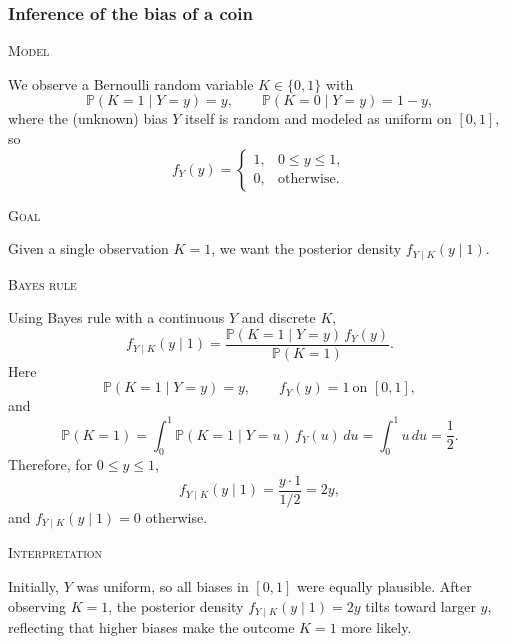 \subsubsection{Inference of the bias of a coin}

\textsc{Model}

We observe a Bernoulli random variable \(K\in\{0,1\}\) with
\[
\mathbb{P}(K=1\mid Y=y)=y,
\qquad
\mathbb{P}(K=0\mid Y=y)=1-y,
\]
where the (unknown) bias \(Y\) itself is random and modeled as uniform on \([0,1]\), so
\[
f_Y(y)
=
\begin{cases}
1, & 0 \le y \le 1,\\
0, & \text{otherwise}.
\end{cases}
\]

\textsc{Goal}

Given a single observation \(K=1\), we want the posterior density \(f_{Y\mid K}(y\mid 1)\).

\textsc{Bayes rule}

Using Bayes rule with a continuous \(Y\) and discrete \(K\),
\[
f_{Y\mid K}(y\mid 1)
=
\frac{\mathbb{P}(K=1\mid Y=y)\,f_Y(y)}
{\mathbb{P}(K=1)}.
\]
Here
\[
\mathbb{P}(K=1\mid Y=y)=y,
\qquad
f_Y(y)=1 \ \text{on }[0,1],
\]
and
\[
\mathbb{P}(K=1)
=
\int_{0}^{1} \mathbb{P}(K=1\mid Y=u)\,f_Y(u)\,du
=
\int_{0}^{1} u\,du
=
\frac{1}{2}.
\]
Therefore, for \(0\le y\le 1\),
\[
f_{Y\mid K}(y\mid 1)
=
\frac{y\cdot 1}{1/2}
=
2y,
\]
and \(f_{Y\mid K}(y\mid 1)=0\) otherwise.

\textsc{Interpretation}

Initially, \(Y\) was uniform, so all biases in \([0,1]\) were equally plausible.  
After observing \(K=1\), the posterior density \(f_{Y\mid K}(y\mid 1)=2y\) tilts toward larger \(y\), reflecting that higher biases make the outcome \(K=1\) more likely.